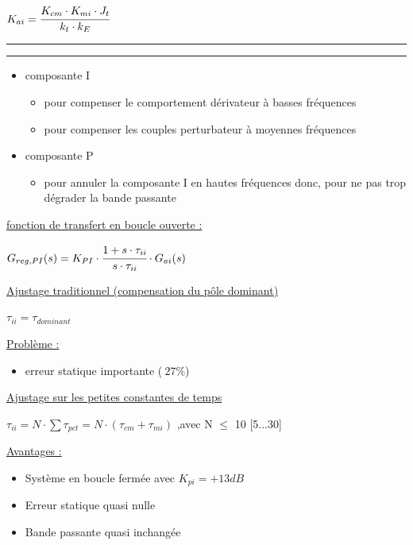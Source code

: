 \documentclass[	DIV=calc,%
							paper=a4,%
							fontsize=10pt,%
							twocolumn]{scrartcl} %
\newcommand{\hformbar}[1]{\bigskip \hrule \vspace{1pt} \hrule \vspace{5pt}} %
\newcounter{mycounter}
\newcommand{\formdesc}[1]{\large\textbf{#1} \addtocounter{mycounter}{1} \hfill \themycounter \\ \vspace{-3mm} \hrule \vspace{2mm}}
\newcommand{\formtitle}[1]{\large\underline{#1}}
\begin{document}
{\footnotesize$K_{ai} = \cfrac{K_{cm} \cdot K_{mi} \cdot J_t}{k_t \cdot k_E}$}

\hformbar

\formdesc{Régulateur PI}

\begin{itemize}
    \item composante I    
        \begin{itemize}
            \item pour compenser le comportement dérivateur à basses fréquences
            \item pour compenser les couples perturbateur à moyennes fréquences
        \end{itemize}
    \item composante P  
    \begin{itemize}
        \item pour annuler la composante I en hautes fréquences donc, pour ne pas trop dégrader la bande passante
    \end{itemize}
\end{itemize}

\formtitle{fonction de transfert en boucle ouverte : }

\vspace{3mm}

{ $G_{reg,{PI}}(s) =  K_{PI} \cdot \cfrac{1+s\cdot\tau_{ii}}{s\cdot\tau_{ii}} \cdot G_{ai}(s) $}

\vspace{3mm}

\formtitle{Ajustage traditionnel (compensation du pôle dominant)}

\vspace{3mm}
$\tau_{ii} = \tau_{dominant}$
\vspace{3mm}

\underline{Problème :}
\begin{itemize}
    \item  erreur statique importante ($~27\%$)
\end{itemize}

\formtitle{Ajustage sur les petites constantes de temps}

\vspace{3mm}
$\tau_{ii} = N \cdot \sum\tau_{pct} = N \cdot (\tau_{cm}+ \tau_{mi})$ ,avec N $\leq$ 10 [5...30]

\underline{Avantages :}
\begin{itemize}
    \item Système en boucle fermée avec $K_{pi} = +13 dB$
    \item Erreur statique quasi nulle
    \item Bande passante quasi inchangée
\end{itemize}
\end{document}
